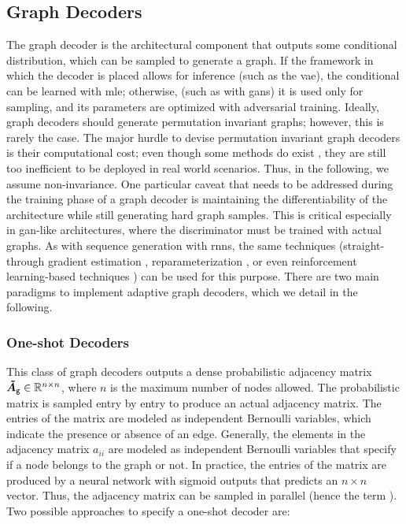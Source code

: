 \subsection{Graph Decoders}
The graph decoder is the architectural component that outputs some conditional distribution, which can be sampled to generate a graph. If the framework in which the decoder is placed allows for inference (such as the \gls{vae}), the conditional can be learned with \gls{mle}; otherwise, (such as with \glspl{gan}) it is used only for sampling, and its parameters are optimized with adversarial training. Ideally, graph decoders should generate permutation invariant graphs; however, this is rarely the case. The major hurdle to devise permutation invariant graph decoders is their computational cost; even though some methods do exist \citep{ermon2020permutationinvariantgraphgeneration}, they are still too inefficient to be deployed in real world scenarios. Thus, in the following, we assume non-invariance.
One particular caveat that needs to be addressed during the training phase of a graph decoder is maintaining the differentiability of the architecture while still generating hard graph samples. This is critical especially in \gls{gan}-like architectures, where the discriminator must be trained with actual graphs. As with sequence generation with \glspl{rnn}, the same techniques (straight-through gradient estimation \cite{bengio2013straighttrough}, reparameterization \cite{kingma2014vae}, or even reinforcement learning-based techniques \cite{williams1992reinforce}) can be used for this purpose. There are two main paradigms to implement adaptive graph decoders, which we detail in the following.

\subsubsection*{One-shot Decoders}
This class of graph decoders outputs a dense probabilistic adjacency matrix $\ProbAdjMatrix{g} \in \Real^{n \times n}$, where $n$ is the maximum number of nodes allowed. The probabilistic matrix is sampled entry by entry to produce an actual adjacency matrix. The entries of the matrix are modeled as independent Bernoulli variables, which indicate the presence or absence of an edge. Generally, the elements in the adjacency matrix $a_{ii}$ are modeled as independent Bernoulli variables that specify if a node belongs to the graph or not. In practice, the entries of the matrix are produced by a neural network with sigmoid outputs that predicts an $n \times n$ vector. Thus, the adjacency matrix can be sampled in parallel (hence the term ). Two possible approaches to specify a one-shot decoder are:

